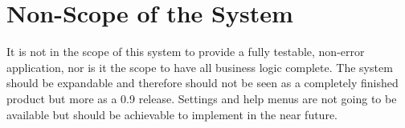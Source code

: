 \section{Non-Scope of the System}
It is not in the scope of this system to provide a fully testable, non-error application, nor is it the scope to have all business logic complete. The system should be expandable and therefore should not be seen as a completely finished product but more as a 0.9 release. Settings and help menus are not going to be available but should be achievable to implement in the near future.